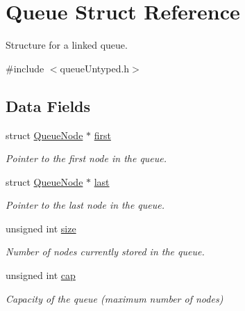 \hypertarget{structQueue}{\section{Queue Struct Reference}
\label{structQueue}
}


Structure for a linked queue.  




{\ttfamily \#include $<$queue\-Untyped.\-h$>$}

\subsection*{Data Fields}
\begin{DoxyCompactItemize}
\item 
\hypertarget{structQueue_ab531b3cd4761aaf61a99c8e72a54c522}{struct \hyperlink{structQueueNode}{Queue\-Node} $\ast$ \hyperlink{structQueue_ab531b3cd4761aaf61a99c8e72a54c522}{first}}\label{structQueue_ab531b3cd4761aaf61a99c8e72a54c522}

\begin{DoxyCompactList}\small\item\em Pointer to the first node in the queue. \end{DoxyCompactList}\item 
\hypertarget{structQueue_a459f24bb614023ccc601d1c6e63e8bfc}{struct \hyperlink{structQueueNode}{Queue\-Node} $\ast$ \hyperlink{structQueue_a459f24bb614023ccc601d1c6e63e8bfc}{last}}\label{structQueue_a459f24bb614023ccc601d1c6e63e8bfc}

\begin{DoxyCompactList}\small\item\em Pointer to the last node in the queue. \end{DoxyCompactList}\item 
\hypertarget{structQueue_aaea99c2b90ab1465f5e2909f83373afe}{unsigned int \hyperlink{structQueue_aaea99c2b90ab1465f5e2909f83373afe}{size}}\label{structQueue_aaea99c2b90ab1465f5e2909f83373afe}

\begin{DoxyCompactList}\small\item\em Number of nodes currently stored in the queue. \end{DoxyCompactList}\item 
\hypertarget{structQueue_a8789ba7d081e47c31599e8b9b51ac20f}{unsigned int \hyperlink{structQueue_a8789ba7d081e47c31599e8b9b51ac20f}{cap}}\label{structQueue_a8789ba7d081e47c31599e8b9b51ac20f}

\begin{DoxyCompactList}\small\item\em Capacity of the queue (maximum number of nodes) \end{DoxyCompactList}\end{DoxyCompactItemize}


